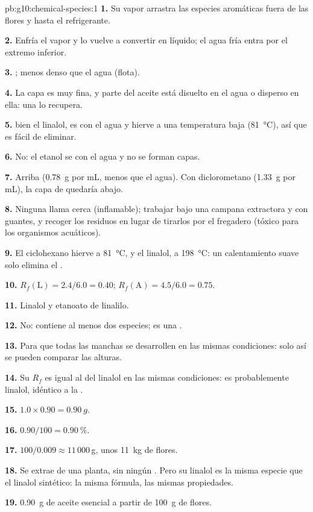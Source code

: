 \begin{solution}{pb:g10:chemical-species:1}
\textbf{1.} Su vapor arrastra las especies aromáticas fuera de las
flores y hasta el refrigerante.

\textbf{2.} Enfría el vapor y lo vuelve a convertir en líquido; el agua
fría entra por el extremo inferior.

\textbf{3.} ; menos denso que el agua (flota).

\textbf{4.} La capa es muy fina, y parte del aceite está disuelto en el
agua o disperso en ella: una  lo recupera.

\textbf{5.}  bien el linalol, es  con el agua y hierve
a una temperatura baja (\qty{81}{\celsius}), así que es fácil de
eliminar.

\textbf{6.} No: el etanol se  con el agua y no se forman capas.

\textbf{7.} Arriba (\qty{0.78}{g} por mL, menos que el agua). Con
diclorometano (\qty{1.33}{g} por mL), la capa de  quedaría
abajo.

\textbf{8.} Ninguna llama cerca (inflamable); trabajar bajo una campana
extractora y con guantes, y recoger los residuos en lugar de tirarlos
por el fregadero (tóxico para los organismos acuáticos).

\textbf{9.} El ciclohexano hierve a \qty{81}{\celsius}, y el linalol, a
\qty{198}{\celsius}: un calentamiento suave solo elimina el .

\textbf{10.} $R_f(\text{L}) = 2.4/6.0 = 0.40$; $R_f(\text{A}) = 4.5/6.0
= 0.75$.

\textbf{11.} Linalol y etanoato de linalilo.

\textbf{12.} No: contiene al menos dos especies; es una .

\textbf{13.} Para que todas las manchas se desarrollen en las mismas
condiciones: solo así se pueden comparar las alturas.

\textbf{14.} Su $R_f$ es igual al del linalol en las mismas condiciones:
es probablemente linalol, idéntico a la .

\textbf{15.} $1.0 \times 0.90 = \qty{0.90}{g}$.

\textbf{16.} $0.90/100 = \qty{0.90}{\percent}$.

\textbf{17.} $100/0.009 \approx 11\,000$\,g, unos \qty{11}{kg} de
flores.

\textbf{18.} Se extrae de una planta, sin ningún . Pero su
linalol es la misma especie que el linalol sintético: la misma fórmula,
las mismas propiedades.

\textbf{19.} \qty{0.90}{g} de aceite esencial a partir de \qty{100}{g}
de flores.
\end{solution}
